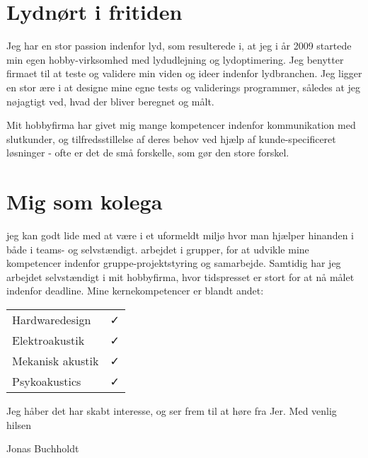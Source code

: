 \documentclass{my_application}
\begin{document}
\section{Lydnørt i fritiden}
Jeg har en stor passion indenfor lyd, som resulterede i, at jeg i år 2009 startede min egen hobby-virksomhed med lydudlejning og lydoptimering. Jeg benytter firmaet til at teste og validere min viden og ideer indenfor lydbranchen. Jeg ligger en stor ære i at designe mine egne tests og validerings programmer, således at jeg nøjagtigt ved, hvad der bliver beregnet og målt. 

Mit hobbyfirma har givet mig mange kompetencer indenfor kommunikation med slutkunder, og tilfredsstillelse af deres behov ved hjælp af kunde-specificeret løsninger - ofte er det de små forskelle, som gør den store forskel.


\section{Mig som kolega}

jeg kan godt lide med at være i et uformeldt miljø hvor man hjælper hinanden i både i teams- og selvstændigt. arbejdet i grupper, for at udvikle mine kompetencer indenfor gruppe-projektstyring og samarbejde. Samtidig har jeg arbejdet selvstændigt i mit hobbyfirma, hvor tidspresset er stort for at nå målet indenfor deadline. 
\skipline
%
Mine kernekompetencer er blandt andet:
\begin{table}[!ht]
	\begin{tabular}{l c}
		Hardwaredesign & \faCheck \\
		Elektroakustik & \faCheck \\
		Mekanisk akustik & \faCheck\\
		Psykoakustics & \faCheck
	\end{tabular}
\end{table}
%
\skipline
%
Jeg håber det har skabt interesse, og ser frem til at høre fra Jer. 
\newline
\newline
Med venlig hilsen

Jonas Buchholdt
\skipline
%	
\end{document}
